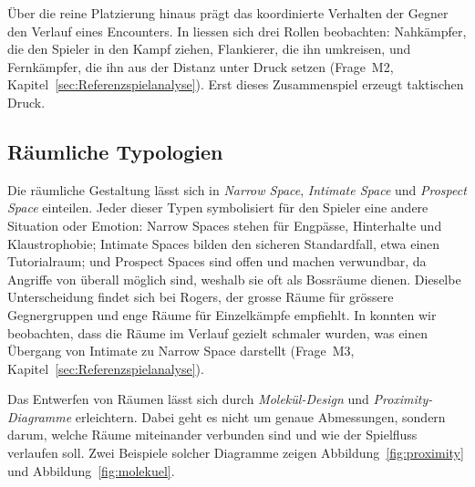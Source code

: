 \documentclass[../Main.tex]{subfiles}
\begin{document}
Über die reine Platzierung hinaus prägt das koordinierte Verhalten der Gegner den Verlauf eines Encounters. In  liessen sich drei Rollen beobachten: Nahkämpfer, die den Spieler in den Kampf ziehen, Flankierer, die ihn umkreisen, und Fernkämpfer, die ihn aus der Distanz unter Druck setzen (Frage~M2, Kapitel~\ref{sec:Referenzspielanalyse}). Erst dieses Zusammenspiel erzeugt taktischen Druck.

\subsection{Räumliche Typologien} \label{sec:Raumtypologien}
Die räumliche Gestaltung lässt sich in \textit{Narrow Space}, \textit{Intimate Space} und \textit{Prospect Space} einteilen. Jeder dieser Typen symbolisiert für den Spieler eine andere Situation oder Emotion: Narrow Spaces stehen für Engpässe, Hinterhalte und Klaustrophobie; Intimate Spaces bilden den sicheren Standardfall, etwa einen Tutorialraum; und Prospect Spaces sind offen und machen verwundbar, da Angriffe von überall möglich sind, weshalb sie oft als Bossräume dienen.\autocite{totten2014architectural} Dieselbe Unterscheidung findet sich bei Rogers, der grosse Räume für grössere Gegnergruppen und enge Räume für Einzelkämpfe empfiehlt.\autocite{rogers2014levelup} In  konnten wir beobachten, dass die Räume im Verlauf gezielt schmaler wurden, was einen Übergang von Intimate zu Narrow Space darstellt (Frage~M3, Kapitel~\ref{sec:Referenzspielanalyse}).

Das Entwerfen von Räumen lässt sich durch \textit{Molekül-Design} und \textit{Proximity-Diagramme} erleichtern. Dabei geht es nicht um genaue Abmessungen, sondern darum, welche Räume miteinander verbunden sind und wie der Spielfluss verlaufen soll.\autocite{totten2014architectural} Zwei Beispiele solcher Diagramme zeigen Abbildung~\ref{fig:proximity} und Abbildung~\ref{fig:molekuel}.
\end{document}
